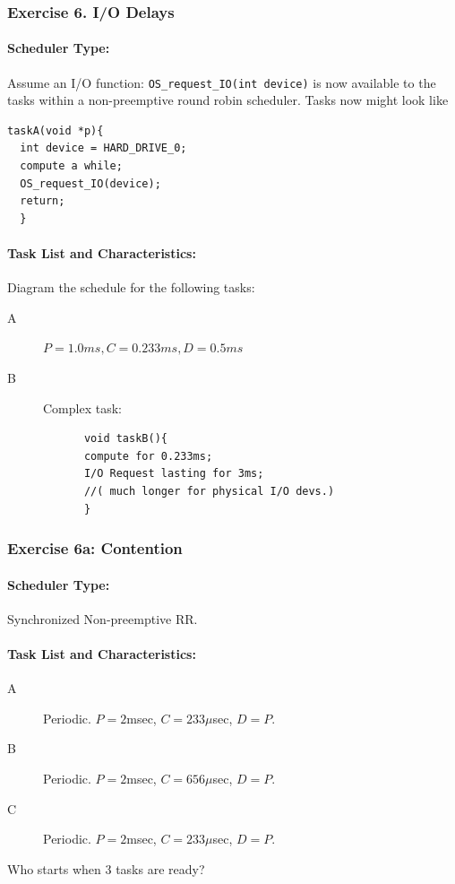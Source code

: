 \documentclass{article}	%
\begin{document}
\subsubsection{Exercise 6. I/O Delays} 

\paragraph{Scheduler Type:} Assume an I/O function: {\tt OS\_request\_IO(int device)} is now available to the tasks within a non-preemptive round robin scheduler.   Tasks now might look like
\begin{verbatim}
taskA(void *p){
  int device = HARD_DRIVE_0;
  compute a while;
  OS_request_IO(device);
  return;
  }
\end{verbatim} 


\paragraph{Task List and Characteristics:}
 Diagram the schedule for the following tasks:
        \begin{description}
                \item[A] $P=1.0ms, C=0.233ms, D=0.5ms$
                \item[B] Complex task:
        \end{description}
\begin{verbatim}
            void taskB(){ 
            compute for 0.233ms;
            I/O Request lasting for 3ms;
            //( much longer for physical I/O devs.)
            }
\end{verbatim} 


 

\subsubsection*{Exercise 6a: Contention}

\paragraph{Scheduler Type:} Synchronized Non-preemptive RR.
\paragraph{Task List and Characteristics:}  
            \begin{description}
              \item [A] Periodic. $P = 2$msec, $C = 233\mu$sec, $D =P$.
              \item [B] Periodic. $P = 2$msec, $C = 656\mu$sec, $D =P$.
              \item [C] Periodic. $P = 2$msec, $C = 233\mu$sec, $D =P$.
        \end{description}
       Who starts when 3 tasks are ready? 
\end{document}
